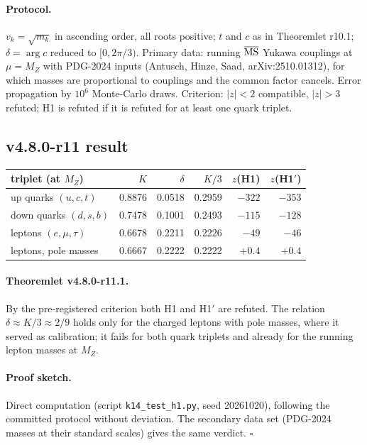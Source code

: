 \paragraph{Protocol.}
\(v_k=\sqrt{m_k}\) in ascending order, all roots positive; \(t\) and \(c\) as in Theoremlet r10.1;
\(\delta=\arg c\) reduced to \([0,2\pi/3)\).  Primary data: running \(\overline{\rm MS}\) Yukawa couplings
at \(\mu=M_Z\) with PDG-2024 inputs (Antusch, Hinze, Saad, arXiv:2510.01312), for which masses are
proportional to couplings and the common factor cancels.  Error propagation by \(10^6\) Monte-Carlo
draws.  Criterion: \(|z|<2\) compatible, \(|z|>3\) refuted; H1 is refuted if it is refuted for at least
one quark triplet.

\subsection*{v4.8.0-r11 result}
\label{subsec:v480-r11-result}

\begin{center}
\small
\begin{tabular}{@{}>{\raggedright\arraybackslash}p{}rrrrr@{}}
\toprule
triplet (at \(M_Z\)) & \(K\) & \(\delta\) & \(K/3\) & \(z\)(H1) & \(z\)(H1\('\))\\
\midrule
up quarks \((u,c,t)\) & 0.8876 & 0.0518 & 0.2959 & \(-322\) & \(-353\)\\
down quarks \((d,s,b)\) & 0.7478 & 0.1001 & 0.2493 & \(-115\) & \(-128\)\\
leptons \((e,\mu,\tau)\) & 0.6678 & 0.2211 & 0.2226 & \(-49\) & \(-46\)\\
leptons, pole masses & 0.6667 & 0.2222 & 0.2222 & \(+0.4\) & \(+0.4\)\\
\bottomrule
\end{tabular}
\end{center}

\paragraph{Theoremlet v4.8.0-r11.1.}
By the pre-registered criterion both H1 and H1\('\) are refuted.  The relation
\(\delta\approx K/3\approx2/9\) holds only for the charged leptons with pole masses, where it served as
calibration; it fails for both quark triplets and already for the running lepton masses at \(M_Z\).

\paragraph{Proof sketch.}
Direct computation (script \texttt{k14\_test\_h1.py}, seed 20261020), following the committed protocol
without deviation.  The secondary data set (PDG-2024 masses at their standard scales) gives the same
verdict.  \(\square\)

